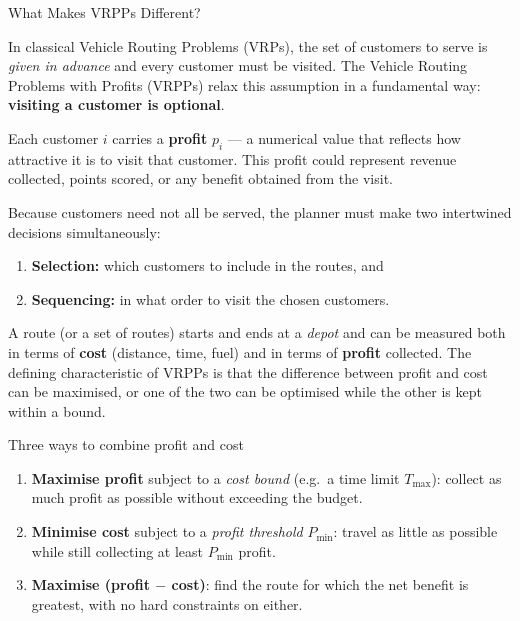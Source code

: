 \documentclass[aspectratio=169,10pt]{beamer}
\begin{document}
\begin{frame}[allowframebreaks]{What Makes VRPPs Different?}

  In classical Vehicle Routing Problems (VRPs), the set of customers to serve
  is \emph{given in advance} and every customer must be visited.
  The Vehicle Routing Problems with Profits (VRPPs) relax this assumption
  in a fundamental way: \textbf{visiting a customer is optional}.

  \medskip
  Each customer $i$ carries a \textbf{profit} $p_i$ --- a numerical value that
  reflects how attractive it is to visit that customer.
  This profit could represent revenue collected, points scored, or any
  benefit obtained from the visit.

  \medskip
  Because customers need not all be served, the planner must make two
  intertwined decisions simultaneously:
  \begin{enumerate}
    \item \textbf{Selection:} which customers to include in the routes, and
    \item \textbf{Sequencing:} in what order to visit the chosen customers.
  \end{enumerate}

  \medskip
  A route (or a set of routes) starts and ends at a \emph{depot} and can
  be measured both in terms of \textbf{cost} (distance, time, fuel) and in
  terms of \textbf{profit} collected.
  The defining characteristic of VRPPs is that the difference between
  profit and cost can be maximised, or one of the two can be optimised
  while the other is kept within a bound.

  \framebreak

  \begin{alertblock}{Three ways to combine profit and cost}
    \begin{enumerate}
      \item \textbf{Maximise profit} subject to a \emph{cost bound} (e.g.\ a
            time limit $T_{\max}$): collect as much profit as possible
            without exceeding the budget.
      \item \textbf{Minimise cost} subject to a \emph{profit threshold}
            $P_{\min}$: travel as little as possible while still collecting
            at least $P_{\min}$ profit.
      \item \textbf{Maximise (profit $-$ cost)}: find the route for which
            the net benefit is greatest, with no hard constraints on either.
    \end{enumerate}
  \end{alertblock}

\end{frame}
\end{document}

